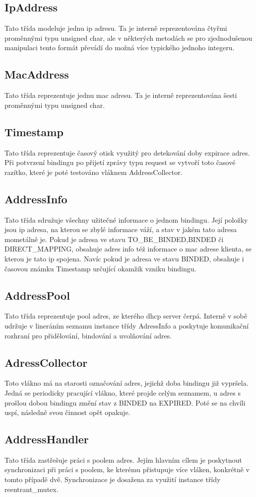 \documentclass[12pt,a4paper]{report}
\begin{document}
\subsection*{IpAddress}
Tato třída modeluje jednu ip adresu. Ta je interně reprezentována čtyřmi proměnnými typu unsigned char, ale v některých metodách se pro zjednodušenou manipulaci tento formát převádí do možná více typického jednoho integeru.
\subsection*{MacAddress}
Tato třída reprezentuje jednu mac adresu. Ta je interně reprezentována šesti proměnnými typu unsigned char. 
\subsection*{Timestamp}
Tato třída reprezentuje časový otisk využitý pro detekování doby expirace adres. Při potvrzení bindingu po přijetí zprávy typu request se vytvoří toto časové razítko, které je poté testováno vláknem AddressCollector. 
\subsection*{AddressInfo}
Tato třída sdružuje všechny užitečné informace o jednom bindingu. Její položky jsou ip adresa, na kterou se zbylé informace váží, a stav v jakém tato adresa mometálně je. Pokud je adresa ve stavu TO\_BE\_BINDED,BINDED či DIRECT\_MAPPING, obsahuje adres info též informace o mac adrese klienta, se kterou je tato ip spojena. Navíc pokud je adresa ve stavu BINDED, obsahuje i časovou známku Timestamp určující okamžik vzniku bindingu.
\subsection*{AddressPool}
Tato třída reprezentuje pool adres, ze kterého dhcp server čerpá. Interně v sobě udržuje v lineráním seznamu instance třídy AdressInfo a poskytuje komunikační rozhraní pro přidělování, bindování a uvolňování adres.
\subsection*{AdressCollector}
Toto vlákno má na starosti označování adres, jejichž doba bindingu již vypršela. Jedná se periodicky pracující vlákno, které projde celým seznamem, u adres s prošlou dobou bindingu změní stav z BINDED na EXPIRED. Poté se na chvíli uspí, následně svou činnost opět opakuje. 
\subsection*{AddressHandler}
Tato třída zastřešuje práci s poolem adres. Jejím hlavním cílem je poskytnout synchronizaci při práci s poolem, ke kterému přistupuje více vláken, konkrétně v tomto případě dvě. Synchronizace je dosažena za využití instance třídy reentrant\_mutex. 
\end{document}
